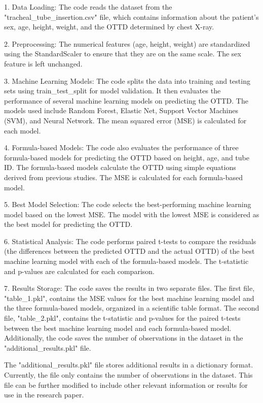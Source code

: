 \documentclass[11pt]{article}
\begin{document}
1. Data Loading: The code reads the dataset from the "tracheal\_tube\_insertion.csv" file, which contains information about the patient's sex, age, height, weight, and the OTTD determined by chest X-ray.

2. Preprocessing: The numerical features (age, height, weight) are standardized using the StandardScaler to ensure that they are on the same scale. The sex feature is left unchanged.

3. Machine Learning Models: The code splits the data into training and testing sets using train\_test\_split for model validation. It then evaluates the performance of several machine learning models on predicting the OTTD. The models used include Random Forest, Elastic Net, Support Vector Machines (SVM), and Neural Network. The mean squared error (MSE) is calculated for each model.

4. Formula-based Models: The code also evaluates the performance of three formula-based models for predicting the OTTD based on height, age, and tube ID. The formula-based models calculate the OTTD using simple equations derived from previous studies. The MSE is calculated for each formula-based model.

5. Best Model Selection: The code selects the best-performing machine learning model based on the lowest MSE. The model with the lowest MSE is considered as the best model for predicting the OTTD.

6. Statistical Analysis: The code performs paired t-tests to compare the residuals (the differences between the predicted OTTD and the actual OTTD) of the best machine learning model with each of the formula-based models. The t-statistic and p-values are calculated for each comparison.

7. Results Storage: The code saves the results in two separate files. The first file, "table\_1.pkl", contains the MSE values for the best machine learning model and the three formula-based models, organized in a scientific table format. The second file, "table\_2.pkl", contains the t-statistic and p-values for the paired t-tests between the best machine learning model and each formula-based model. Additionally, the code saves the number of observations in the dataset in the "additional\_results.pkl" file.

The "additional\_results.pkl" file stores additional results in a dictionary format. Currently, the file only contains the number of observations in the dataset. This file can be further modified to include other relevant information or results for use in the research paper.
\end{document}
